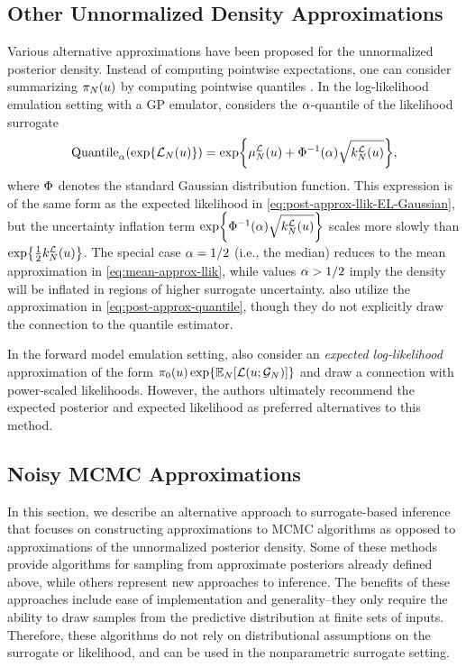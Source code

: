 \documentclass[12pt]{article}
\begin{document}
\subsection{Other Unnormalized Density Approximations}
Various alternative approximations have been proposed for the unnormalized posterior density. 
Instead of computing pointwise expectations, one can consider summarizing $\postEm[\Ndesign](\Par)$
by computing pointwise quantiles \citep{VehtariParallelGP,quantileApprox}. In the log-likelihood 
emulation setting with a GP emulator, \cite{VehtariParallelGP} considers the $\quantileProb$-quantile of 
the likelihood surrogate
\begin{equation}
\mathrm{Quantile}_{\quantileProb}(\Exp{\llikEm[\Ndesign](\Par)})
= \Exp{\emMean[\Ndesign]{\llik}(\Par) + \GaussianCDF^{-1}(\quantileProb) \sqrt{\emKer[\Ndesign]{\llik}(\Par)}},
\label{eq:post-approx-quantile}
\end{equation}
where $\GaussianCDF$ denotes the standard Gaussian distribution function. This expression is of the same form 
as the expected likelihood in \cref{eq:post-approx-llik-EL-Gaussian}, but the uncertainty inflation term 
$\Exp{\GaussianCDF^{-1}(\quantileProb) \sqrt{\emKer[\Ndesign]{\llik}(\Par)}}$ scales more slowly than 
$\Exp{\frac{1}{2} \emKer[\Ndesign]{\llik}(\Par)}$. The special case $\quantileProb = 1/2$ (i.e., the median) 
reduces to the mean approximation in \cref{eq:mean-approx-llik}, while values $\quantileProb > 1/2$ imply 
the density will be inflated in regions of higher surrogate uncertainty. \citet{FATES_CES} also utilize the 
approximation in \cref{eq:post-approx-quantile}, though they do not explicitly draw the connection to 
the quantile estimator.

In the forward model emulation setting, \citet{BurknerSurrogate} also consider an \textit{expected log-likelihood}
approximation of the form $\priorDens(\Par) \Exp{\E_{\Ndesign}[\llik(\Par; \fwdEm[\Ndesign])]}$ and draw 
a connection with power-scaled likelihoods. However, the authors ultimately recommend the expected 
posterior and expected likelihood as preferred alternatives to this method.

\subsection{Noisy MCMC Approximations} \label{sec:MH-approx}
In this section, we describe an alternative approach to surrogate-based inference
that focuses on constructing approximations to MCMC algorithms as opposed to approximations
of the unnormalized posterior density. Some of these methods provide algorithms for sampling 
from approximate posteriors already defined above, while others represent new approaches to inference.
The benefits of these approaches include ease of implementation and generality--they only require 
the ability to draw samples from the predictive distribution at finite sets of inputs.
Therefore, these algorithms do not rely on distributional 
assumptions on the surrogate or likelihood, and can be used in the nonparametric surrogate setting.
\end{document}
